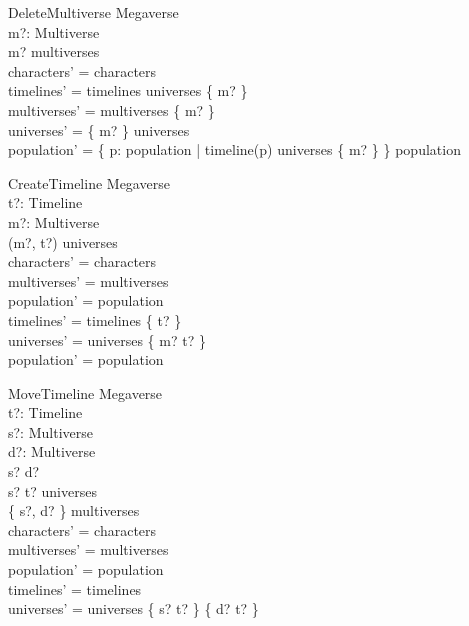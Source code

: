 \documentclass{article}
\begin{document}
\begin{schema}{DeleteMultiverse}
\Delta Megaverse \\
m?: Multiverse \\
\where
m? \in multiverses \\
characters' = characters \\
timelines' = timelines \setminus universes \limg \{ m? \} \rimg   \\
multiverses' = multiverses \setminus \{ m? \} \\
universes' = \{ m? \} \ndres universes \\
population' = \{ p: \dom population | timeline(p) \in universes \limg \{ m? \} \rimg \} \ndres population \\
\end{schema} 

\begin{schema}{CreateTimeline}
\Delta Megaverse \\
t?: Timeline \\
m?: Multiverse \\
\where
(m?, t?) \notin universes \\ 
characters' = characters \\ 
multiverses' = multiverses \\
population' = population \\ 
timelines' = timelines \cup \{ t? \} \\
universes' = universes \cup \{ m? \mapsto t? \} \\
population' = population \\
\end{schema}

\begin{schema}{MoveTimeline}
\Delta Megaverse \\
t?: Timeline \\
s?: Multiverse \\
d?: Multiverse \\
\where
s? \neq d? \\
s? \mapsto t? \in universes \\
\{ s?, d? \} \subseteq multiverses \\
characters' = characters \\ 
multiverses' = multiverses \\
population' = population \\
timelines' = timelines \\ 
universes' = universes \setminus \{ s? \mapsto t? \} \cup \{ d? \mapsto t? \} \\
\end{schema}
\end{document}
